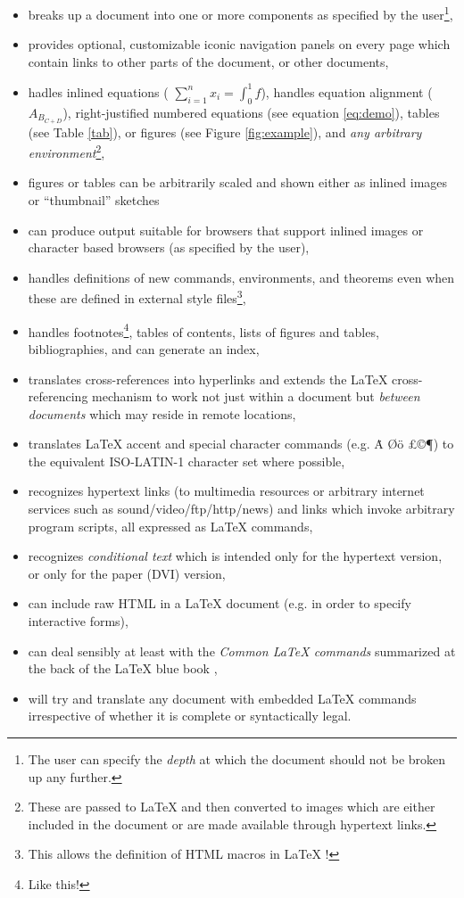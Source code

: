 \begin{itemize}
\item breaks up a document into one or more components as specified
by the user\footnote{The user can specify the {\em depth} at which 
the document should not be broken up any further.},
\item provides optional, customizable iconic navigation
panels on every page which contain links to other parts of the
document, or other documents,
\item hadles inlined equations ( \(\sum_{i=1}^{n} x_{i} =
\int_{0}^{1} f \)), handles equation alignment ($A_{B_{C+D}}$), 
right-justified numbered equations
(see equation \ref{eq:demo}), tables (see Table \ref{tab}), or
figures (see Figure \ref{fig:example}),
and {\em any arbitrary environment}\footnote{These are
passed to LaTeX and then converted to images which are either included
in the document or are made available through hypertext links.},

\item 
figures or tables can be arbitrarily scaled and shown either as
inlined images or ``thumbnail'' sketches
\item can produce output suitable for browsers that support inlined
images or character based browsers (as specified by the user),
\item handles definitions of new commands, environments, and theorems
even when these are defined in external style files\footnote{
This allows the definition of HTML macros in LaTeX  !},
\item handles footnotes\footnote{Like this!}, tables of contents, lists
of figures and tables, bibliographies, and can generate an
 index,
\item translates cross-references into hyperlinks and 
extends the LaTeX cross-referencing mechanism to work
not just within a document but {\em between documents} which may
reside in remote locations, 
\item translates LaTeX accent and special character commands
(e.g. \. {A} \O \"o \pounds \copyright \P) to
the equivalent ISO-LATIN-1 character set where possible,
\item recognizes hypertext links (to multimedia resources or
arbitrary internet services such as sound/video/ftp/http/news) and
links which invoke arbitrary program scripts,
all expressed as LaTeX commands,
\item recognizes {\em conditional text}  which is intended only for
the hypertext version, or only for the paper (DVI) version,
\item can include raw HTML in a LaTeX document (e.g. in order to
specify interactive forms),
\item can deal sensibly at least with the {\em Common LaTeX  commands}
summarized at the back of the LaTeX  blue book \cite{lamp:latex},
\item will try and translate any document with embedded LaTeX commands 
irrespective of whether it is complete or syntactically legal.
\end{itemize}

